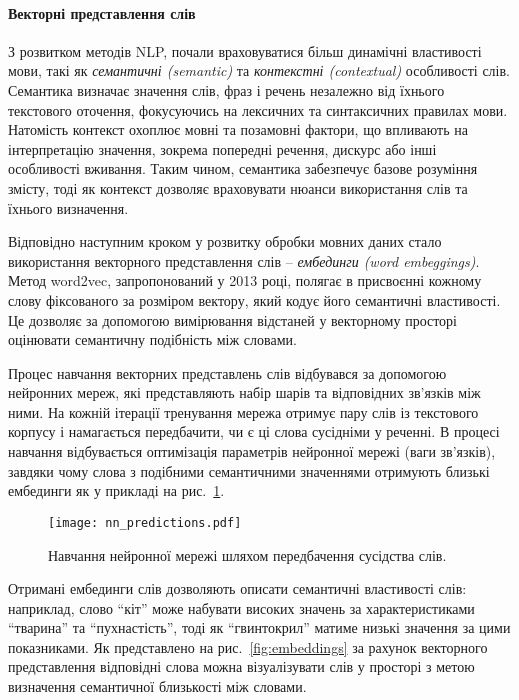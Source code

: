 \paragraph{Векторні представлення слів}
З розвитком методів NLP, почали враховуватися більш динамічні властивості мови, такі як \emph{семантичні (semantic)} та \emph{контекстні (contextual)} особливості слів. Семантика визначає значення слів, фраз і речень незалежно від їхнього текстового оточення, фокусуючись на лексичних та синтаксичних правилах мови. Натомість контекст охоплює мовні та позамовні фактори, що впливають на інтерпретацію значення, зокрема попередні речення, дискурс або інші особливості вживання. Таким чином, семантика забезпечує базове розуміння змісту, тоді як контекст дозволяє враховувати нюанси використання слів та їхнього визначення.

Відповідно наступним кроком у розвитку обробки мовних даних стало використання векторного представлення слів -- \emph{ембединги (word embeggings)}. Метод word2vec, запропонований у 2013 році, полягає в присвоєнні кожному слову фіксованого за розміром вектору, який кодує його семантичні властивості. Це дозволяє за допомогою вимірювання відстаней у векторному просторі оцінювати семантичну подібність між словами.

Процес навчання векторних представлень слів відбувався за допомогою нейронних мереж, які представляють набір шарів та відповідних зв'язків між ними. На кожній ітерації тренування мережа отримує пару слів із текстового корпусу і намагається передбачити, чи є ці слова сусідніми у реченні. В процесі навчання відбувається оптимізація параметрів нейронної мережі (ваги зв'язків), завдяки чому слова з подібними семантичними значеннями отримують близькі ембединги як у прикладі на рис.~\ref{fig:nn_predictions}.

\begin{figure}[!h]
    \centering
    \texttt{[image: nn\_predictions.pdf]}
    \caption{Навчання нейронної мережі шляхом передбачення сусідства слів.}
    \label{fig:nn_predictions}
\end{figure}

Отримані ембединги слів дозволяють описати семантичні властивості слів: наприклад, слово ``кіт'' може набувати високих значень за характеристиками ``тварина'' та ``пухнастість'', тоді як ``гвинтокрил'' матиме низькі значення за цими показниками. Як представлено на рис.~\ref{fig:embeddings} за рахунок векторного представлення відповідні слова можна візуалізувати слів у просторі з метою визначення семантичної близькості між словами.


